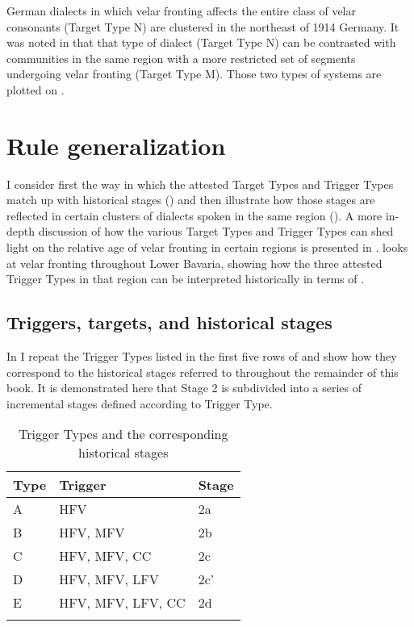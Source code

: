 German dialects in which velar fronting affects the entire class of velar consonants (Target Type N) are clustered in the northeast of 1914 Germany. It was noted in  that that type of dialect (Target Type N) can be contrasted with communities in the same region with a more restricted set of segments undergoing velar fronting (Target Type M). Those two types of systems are plotted on .

\section{{Rule} {generalization}}\label{sec:12.5}

I consider first the way in which the attested Target Types and Trigger Types match up with historical stages () and then illustrate how those stages are reflected in certain clusters of dialects spoken in the same region (). A more in-depth discussion of how the various Target Types and Trigger Types can shed light on the relative age of velar fronting in certain regions is presented in .  looks at velar fronting throughout Lower Bavaria, showing how the three attested Trigger Types in that region can be interpreted historically in terms of .

\subsection{Triggers, targets, and historical stages}\label{sec:12.5.1}

In  I repeat the Trigger Types listed in the first five rows of  and show how they correspond to the historical stages referred to throughout the remainder of this book. It is demonstrated here that Stage 2 is subdivided into a series of incremental stages defined according to Trigger Type.

\begin{table}
\caption{Trigger Types and the corresponding historical stages\label{tab:12.23}}
\begin{tabular}{lll}
\lsptoprule
Type & Trigger & Stage\\\midrule
A & HFV & 2a\\
B & HFV, MFV & 2b\\
C & HFV, MFV, CC & 2c\\
D & HFV, MFV, LFV & 2c'\\
E & HFV, MFV, LFV, CC & 2d\\
\lspbottomrule
\end{tabular}
\end{table}


